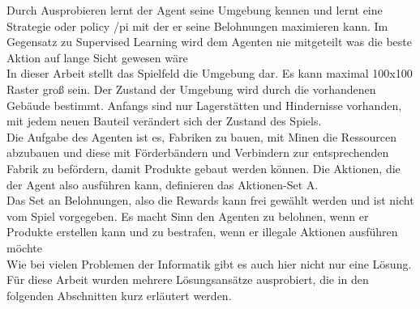 Durch Ausprobieren lernt der Agent seine Umgebung kennen und lernt eine Strategie oder policy /pi mit der er seine Belohnungen maximieren kann. Im Gegensatz zu Supervised Learning wird dem Agenten nie mitgeteilt was die beste Aktion auf lange Sicht gewesen wäre  
\\
In dieser Arbeit stellt das Spielfeld die Umgebung dar. Es kann maximal 100x100 Raster groß sein. Der Zustand der Umgebung wird durch die vorhandenen Gebäude  bestimmt. Anfangs sind nur Lagerstätten und Hindernisse vorhanden, mit jedem neuen Bauteil verändert sich der Zustand des Spiels.
\\
Die Aufgabe des Agenten ist es, Fabriken zu bauen, mit Minen die Ressourcen abzubauen und diese mit Förderbändern und Verbindern zur entsprechenden Fabrik zu befördern, damit Produkte gebaut werden können.
Die Aktionen, die der Agent also ausführen kann, definieren das Aktionen-Set A.
\\
Das Set an Belohnungen, also die Rewards kann frei gewählt werden und ist nicht vom Spiel vorgegeben. Es macht Sinn den Agenten zu belohnen, wenn er Produkte erstellen kann und zu bestrafen, wenn er illegale Aktionen ausführen möchte
\\
Wie bei vielen Problemen der Informatik gibt es auch hier nicht nur eine Lösung. Für diese Arbeit wurden mehrere Lösungsansätze ausprobiert, die in den folgenden Abschnitten kurz erläutert werden.

